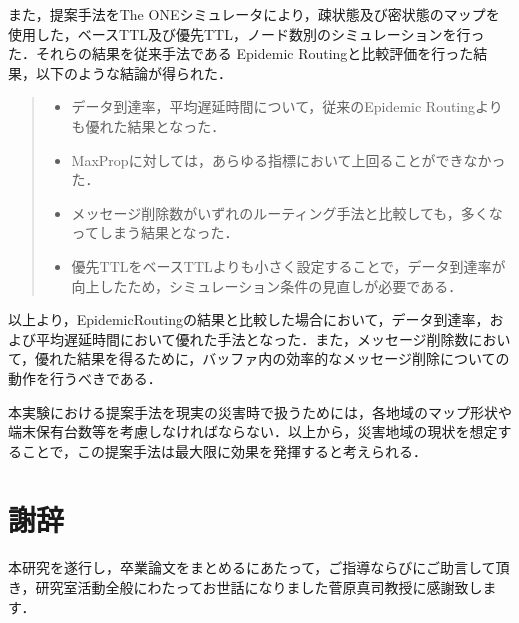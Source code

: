 \documentclass[11pt]{icsthesis}
\begin{document}
また，提案手法をThe ONEシミュレータにより，疎状態及び密状態のマップを使用した，ベースTTL及び優先TTL，ノード数別のシミュレーションを行った．それらの結果を従来手法である
Epidemic Routingと比較評価を行った結果，以下のような結論が得られた．

\begin{quote}
 \begin{itemize}
	\item データ到達率，平均遅延時間について，従来のEpidemic Routingよりも優れた結果となった．
	\item MaxPropに対しては，あらゆる指標において上回ることができなかった．
	\item メッセージ削除数がいずれのルーティング手法と比較しても，多くなってしまう結果となった．
  \item 優先TTLをベースTTLよりも小さく設定することで，データ到達率が向上したため，シミュレーション条件の見直しが必要である．
   \end{itemize}
\end{quote}

以上より，EpidemicRoutingの結果と比較した場合において，データ到達率，および平均遅延時間において優れた手法となった．また，メッセージ削除数において，優れた結果を得るために，バッファ内の効率的なメッセージ削除についての動作を行うべきである．

本実験における提案手法を現実の災害時で扱うためには，各地域のマップ形状や端末保有台数等を考慮しなければならない．以上から，災害地域の現状を想定することで，この提案手法は最大限に効果を発揮すると考えられる．


\clearpage
\fancyhead[L]{}\fancyhead[R]{}
\renewcommand{\headrulewidth}{0truemm}
\section*{謝辞}
本研究を遂行し，卒業論文をまとめるにあたって，ご指導ならびにご助言して頂き，研究室活動全般にわたってお世話になりました菅原真司教授に感謝致します．
\end{document}
